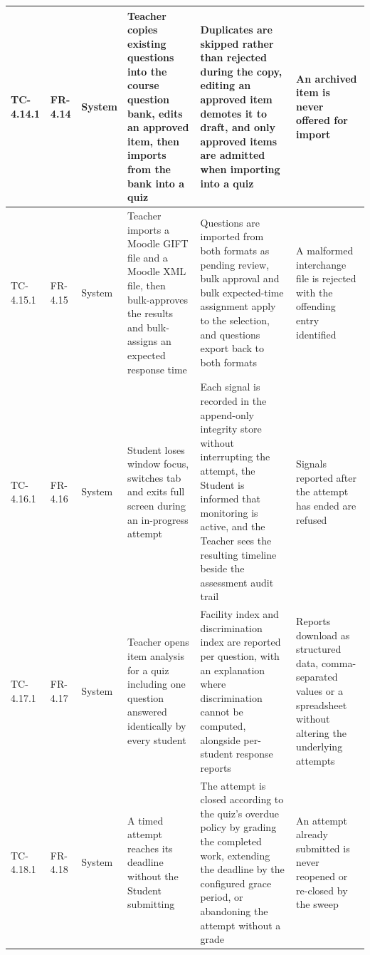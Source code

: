 \begin{longtable}{|>{\centering\arraybackslash}m{}|>{\centering\arraybackslash}m{}|>{\centering\arraybackslash}m{}|m{}|m{}|m{}|}
TC-4.14.1 & FR-4.14 & System & Teacher copies existing questions into the course question bank, edits an approved item, then imports from the bank into a quiz & Duplicates are skipped rather than rejected during the copy, editing an approved item demotes it to draft, and only approved items are admitted when importing into a quiz & An archived item is never offered for import \\ \hline

TC-4.15.1 & FR-4.15 & System & Teacher imports a Moodle GIFT file and a Moodle XML file, then bulk-approves the results and bulk-assigns an expected response time & Questions are imported from both formats as pending review, bulk approval and bulk expected-time assignment apply to the selection, and questions export back to both formats & A malformed interchange file is rejected with the offending entry identified \\ \hline

TC-4.16.1 & FR-4.16 & System & Student loses window focus, switches tab and exits full screen during an in-progress attempt & Each signal is recorded in the append-only integrity store without interrupting the attempt, the Student is informed that monitoring is active, and the Teacher sees the resulting timeline beside the assessment audit trail & Signals reported after the attempt has ended are refused \\ \hline

TC-4.17.1 & FR-4.17 & System & Teacher opens item analysis for a quiz including one question answered identically by every student & Facility index and discrimination index are reported per question, with an explanation where discrimination cannot be computed, alongside per-student response reports & Reports download as structured data, comma-separated values or a spreadsheet without altering the underlying attempts \\ \hline

TC-4.18.1 & FR-4.18 & System & A timed attempt reaches its deadline without the Student submitting & The attempt is closed according to the quiz's overdue policy by grading the completed work, extending the deadline by the configured grace period, or abandoning the attempt without a grade & An attempt already submitted is never reopened or re-closed by the sweep \\ \hline

\end{longtable}


